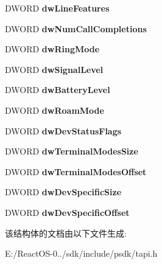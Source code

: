 \begin{DoxyCompactItemize}
D\+W\+O\+RD {\bfseries dw\+Line\+Features}
\item 
\mbox{\label{structlinedevstatus__tag_ae506c7512af23d856f8c56285a215b4c}} 
D\+W\+O\+RD {\bfseries dw\+Num\+Call\+Completions}
\item 
\mbox{\label{structlinedevstatus__tag_a5fb405584a3a79f1cf2c39897be9a609}} 
D\+W\+O\+RD {\bfseries dw\+Ring\+Mode}
\item 
\mbox{\label{structlinedevstatus__tag_a1a730dc6d60c3612282a181535e9866f}} 
D\+W\+O\+RD {\bfseries dw\+Signal\+Level}
\item 
\mbox{\label{structlinedevstatus__tag_a4963fdce9e931130a7bd79ce8692cb1f}} 
D\+W\+O\+RD {\bfseries dw\+Battery\+Level}
\item 
\mbox{\label{structlinedevstatus__tag_af29f7cda5d03dfa7bc686c0073eed20a}} 
D\+W\+O\+RD {\bfseries dw\+Roam\+Mode}
\item 
\mbox{\label{structlinedevstatus__tag_a3e0434dbc1fe0a25ce8709208046f4e2}} 
D\+W\+O\+RD {\bfseries dw\+Dev\+Status\+Flags}
\item 
\mbox{\label{structlinedevstatus__tag_a2141612200b43a831c578a91f4611799}} 
D\+W\+O\+RD {\bfseries dw\+Terminal\+Modes\+Size}
\item 
\mbox{\label{structlinedevstatus__tag_a65d8ad6827ccf7a74c2443d1a9e44b78}} 
D\+W\+O\+RD {\bfseries dw\+Terminal\+Modes\+Offset}
\item 
\mbox{\label{structlinedevstatus__tag_a8058eef1e90c2a1e157d500aeb3da0ae}} 
D\+W\+O\+RD {\bfseries dw\+Dev\+Specific\+Size}
\item 
\mbox{\label{structlinedevstatus__tag_a135e3296d7d20c04baf9e6eeeccab756}} 
D\+W\+O\+RD {\bfseries dw\+Dev\+Specific\+Offset}
\end{DoxyCompactItemize}


该结构体的文档由以下文件生成\+:\begin{DoxyCompactItemize}
\item 
E\+:/\+React\+O\+S-\/0../sdk/include/psdk/tapi.\+h\end{DoxyCompactItemize}
